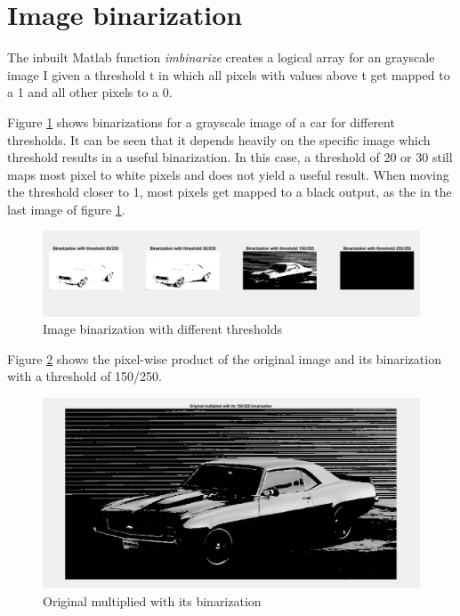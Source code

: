 \section{Image binarization}

The inbuilt Matlab function \textit{imbinarize} creates a logical array for an grayscale image I given a threshold t in which all pixels with values above t get mapped to a 1 and all other pixels to a 0.

Figure \ref{fig:task19} shows binarizations for a grayscale image of a car for different thresholds. It can be seen that it depends heavily on the specific image which threshold results in a useful binarization. In this case, a threshold of 20 or 30 still maps most pixel to white pixels and does not yield a useful result. When moving the threshold closer to 1, most pixels get mapped to a black output, as the in the last image of figure \ref{fig:task19}.

\begin{figure}[!hbt]
  \includegraphics[width=\textwidth]{./img/task19.png}
  \caption{Image binarization with different thresholds}
  \label{fig:task19}
\end{figure}

Figure \ref{fig:task20} shows the pixel-wise product of the original image and its binarization with a threshold of 150/250.

\begin{figure}[!hbt]
  \includegraphics[width=\textwidth]{./img/task20.png}
  \caption{Original multiplied with its binarization}
  \label{fig:task20}
\end{figure}

